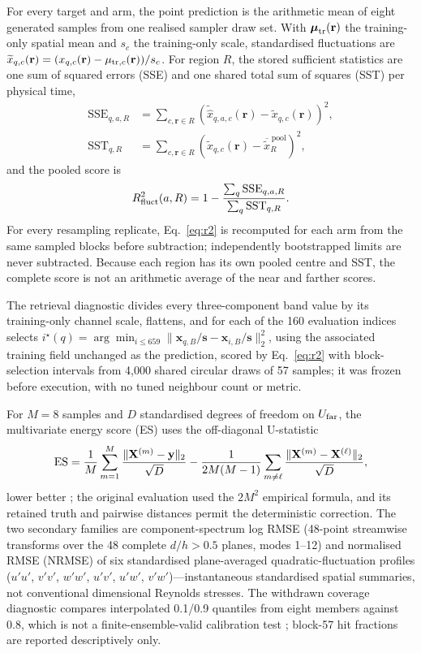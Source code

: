 For every target and arm, the point prediction is the arithmetic mean of eight generated samples
from one realised sampler draw set. With $\boldsymbol\mu_{\rm tr}(\mathbf r)$ the training-only
spatial mean and $s_c$ the training-only scale, standardised fluctuations are
$\widetilde x_{q,c}(\mathbf r)=(x_{q,c}(\mathbf r)-\mu_{{\rm tr},c}(\mathbf r))/s_c$. For region
$R$, the stored sufficient statistics are one sum of squared errors (SSE) and one shared total
sum of squares (SST) per physical time,
\begin{align}
\mathrm{SSE}_{q,a,R}
&=\sum_{c,\mathbf r\in R}
(\widetilde{\widehat x}_{q,a,c}(\mathbf r)-\widetilde x_{q,c}(\mathbf r))^2,\\
\mathrm{SST}_{q,R}
&=\sum_{c,\mathbf r\in R}
(\widetilde x_{q,c}(\mathbf r)-\overline{\widetilde x}^{\,\mathrm{pool}}_R)^2 ,
\end{align}
and the pooled score is
\begin{equation}
R^2_{\mathrm{fluct}}(a,R)=1-\frac{\sum_q\mathrm{SSE}_{q,a,R}}
{\sum_q\mathrm{SST}_{q,R}}.
\label{eq:r2}
\end{equation}
For every resampling replicate, Eq.~\eqref{eq:r2} is recomputed for each arm from the same sampled
blocks before subtraction; independently bootstrapped limits are never subtracted. Because each
region has its own pooled centre and SST, the complete score is not an arithmetic average of the
near and farther scores.

The retrieval diagnostic divides every three-component band value by its training-only channel
scale, flattens, and for each of the 160 evaluation indices selects
$i^\star(q)=\arg\min_{i\leq659}\|\mathbf x_{q,B}/\mathbf s-\mathbf x_{i,B}/\mathbf s\|_2^2$, using
the associated training field unchanged as the prediction, scored by Eq.~\eqref{eq:r2} with
block-selection intervals from 4,000 shared circular draws of 57 samples; it was
frozen before execution, with no tuned neighbour count or metric.

For $M=8$ samples and $D$ standardised degrees of freedom on $U_{\rm far}$, the multivariate
energy score (ES) uses the off-diagonal U-statistic
\begin{equation}
\mathrm{ES}=
\frac{1}{M}\sum_{m=1}^{M}\frac{\|\mathbf X^{(m)}-\mathbf y\|_2}{\sqrt D}
-\frac{1}{2M(M-1)}\sum_{m\ne\ell}
\frac{\|\mathbf X^{(m)}-\mathbf X^{(\ell)}\|_2}{\sqrt D},
\label{eq:es}
\end{equation}
lower better \cite{gneiting2007crps,hersbach2000crps}; the original evaluation used the $2M^2$ empirical
formula, and its retained truth and pairwise distances permit the deterministic correction. The
two secondary families are component-spectrum log RMSE (48-point streamwise transforms over the 48
complete $d/h>0.5$ planes, modes 1--12) and normalised RMSE (NRMSE) of six standardised
plane-averaged
quadratic-fluctuation profiles ($u'u'$, $v'v'$, $w'w'$, $u'v'$, $u'w'$, $v'w'$)---instantaneous
standardised spatial summaries, not conventional dimensional Reynolds stresses. The withdrawn
coverage diagnostic compares interpolated 0.1/0.9 quantiles from eight members against 0.8, which
is not a finite-ensemble-valid calibration test \cite{talts2018sbc}; block-57 hit fractions are
reported descriptively only.

